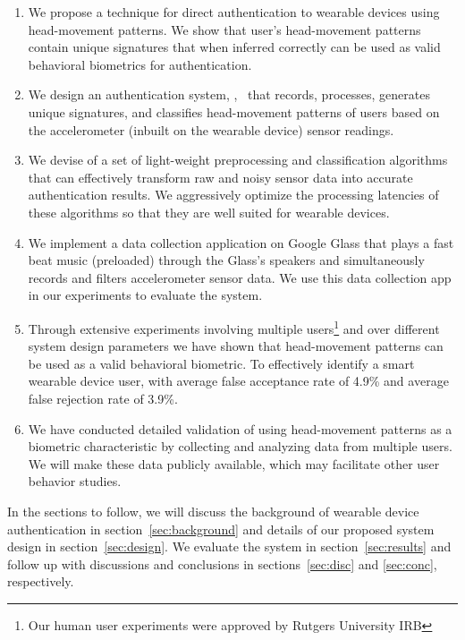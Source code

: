 \begin{enumerate}

\item We propose a technique for direct authentication to wearable devices
using head-movement patterns. We show that user's head-movement patterns
contain unique signatures that when inferred correctly can be used as valid
behavioral biometrics for authentication.

\item We design an authentication system, \systemname,~ that records,
processes, generates unique signatures, and classifies head-movement patterns
of users based on the accelerometer (inbuilt on the wearable device) sensor
readings.

\item We devise of a set of light-weight preprocessing and classification algorithms that can effectively transform raw and noisy sensor data into accurate authentication results. We aggressively optimize the processing latencies of these algorithms so that they are well suited for wearable devices.

\item We implement a data collection application on Google Glass that plays a
fast beat music (preloaded) through the Glass's speakers and simultaneously
records and filters accelerometer sensor data. We use this data collection app
in our experiments to evaluate the system.

\item Through extensive experiments involving multiple users\footnote{Our
human user experiments were approved by Rutgers University IRB} and over
different system design parameters we have shown that head-movement patterns
can be used as a
valid behavioral biometric.
To effectively identify a smart wearable device user,
with average false acceptance rate of 4.9\% and average false rejection rate
of 3.9\%.

\item We have conducted detailed validation of using head-movement patterns as a biometric characteristic by collecting and analyzing data from multiple users. We will make these data publicly available, which may facilitate other user behavior studies.
\end{enumerate}

In the sections to follow, we will discuss the background of wearable
device authentication in section~\ref{sec:background} and details of our
proposed system design in section~\ref{sec:design}. We evaluate the system in
section~\ref{sec:results} and follow up with discussions and conclusions in
sections~\ref{sec:disc} and \ref{sec:conc}, respectively.












